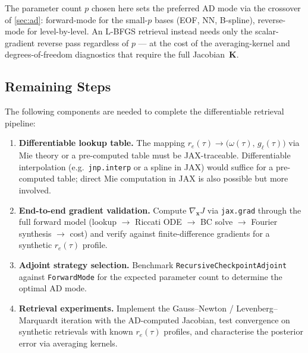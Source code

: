 \documentclass[11pt,a4paper]{article}
\newcommand{\vect}[1]{\bm{#1}}
\newcommand{\mat}[1]{\mathbf{#1}}
\theoremstyle{definition}
\begin{document}
The parameter count $p$ chosen here sets the preferred AD mode via the
crossover of \cref{sec:ad}: forward-mode for the small-$p$ bases
(EOF, NN, B-spline), reverse-mode for level-by-level.  An L-BFGS
retrieval instead needs only the scalar-gradient reverse pass regardless
of $p$ --- at the cost of the averaging-kernel and degrees-of-freedom
diagnostics that require the full Jacobian~$\mat{K}$.

\subsection{Remaining Steps}\label{sec:remaining}

The following components are needed to complete the differentiable
retrieval pipeline:

\begin{enumerate}
  \item \textbf{Differentiable lookup table.}  The mapping
    $r_e(\tau) \to \bigl(\omega(\tau),\, g_\ell(\tau)\bigr)$ via Mie
    theory or a pre-computed table must be JAX-traceable.
    Differentiable interpolation (e.g.\ \texttt{jnp.interp} or a
    spline in JAX) would suffice for a pre-computed table; direct Mie
    computation in JAX is also possible but more involved.

  \item \textbf{End-to-end gradient validation.}  Compute
    $\nabla_{\!\vect{x}} J$ via \texttt{jax.grad} through the full
    forward model (lookup $\to$ Riccati ODE $\to$ BC solve $\to$
    Fourier synthesis $\to$ cost) and verify against finite-difference
    gradients for a synthetic $r_e(\tau)$ profile.

  \item \textbf{Adjoint strategy selection.}  Benchmark
    \texttt{RecursiveCheckpointAdjoint} against \texttt{ForwardMode}
    for the expected parameter count to determine the optimal AD mode.

  \item \textbf{Retrieval experiments.}  Implement the Gauss--Newton /
    Levenberg--Marquardt iteration with the AD-computed Jacobian,
    test convergence on synthetic retrievals with known $r_e(\tau)$
    profiles, and characterise the posterior error via averaging
    kernels.
\end{enumerate}
\end{document}
